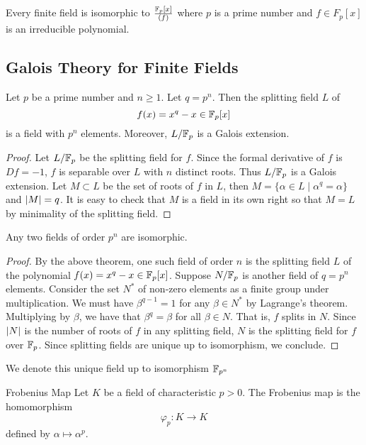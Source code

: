 \documentclass[a4paper]{article}
\begin{document}
\begin{prp}{}{} Every finite field is isomorphic to $\frac{\mathbb{F}_p[x]}{(f)}$ where $p$ is a prime number and $f\in F_p[x]$ is an irreducible polynomial. 
\end{prp}

\subsection{Galois Theory for Finite Fields}
\begin{thm}{}{} Let $p$ be a prime number and $n\geq 1$. Let $q=p^n$. Then the splitting field $L$ of $$f(x)=x^q-x\in \mathbb{F}_p[x]$$ is a field with $p^n$ elements. Moreover, $L/\mathbb{F}_p$ is a Galois extension. \tcbline
\begin{proof}
Let $L/\mathbb{F}_p$ be the splitting field for $f$. Since the formal derivative of $f$ is $Df=-1$, $f$ is separable over $L$ with $n$ distinct roots. Thus $L/\mathbb{F}_p$ is a Galois extension. Let $M\subset L$ be the set of roots of $f$ in $L$, then $M=\{\alpha\in L\;|\;\alpha^q=\alpha\}$ and $\abs{M}=q$. It is easy to check that $M$ is a field in its own right so that $M=L$ by minimality of the splitting field. 
\end{proof}
\end{thm}

\begin{prp}{}{} Any two fields of order $p^n$ are isomorphic. \tcbline
\begin{proof}
By the above theorem, one such field of order $n$ is the splitting field $L$ of the polynomial $f(x)=x^q-x\in\mathbb{F}_p[x]$. Suppose $N/\mathbb{F}_p$ is another field of $q=p^n$ elements. Consider the set $N^\ast$ of non-zero elements as a finite group under multiplication. We must have $\beta^{q-1}=1$ for any $\beta\in N^\ast$ by Lagrange's theorem. Multiplying by $\beta$, we have that $\beta^q=\beta$ for all $\beta\in N$. That is, $f$ splits in $N$. Since $\abs{N}$ is the number of roots of $f$ in any splitting field, $N$ is the splitting field for $f$ over $\mathbb{F}_p$. Since splitting fields are unique up to isomorphism, we conclude. 
\end{proof}
\end{prp}

We denote this unique field up to isomorphism $\mathbb{F}_{p^n}$

\begin{defn}{Frobenius Map}{} Let $K$ be a field of characteristic $p>0$. The Frobenius map is the homomorphism $$\varphi_p:K\to K$$ defined by $\alpha\mapsto\alpha^p$. 
\end{defn}
\end{document}
